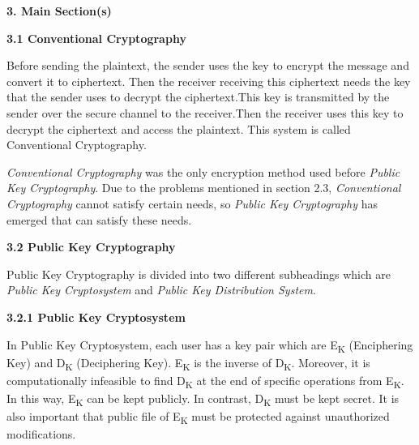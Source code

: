 \documentclass{article}
\begin{document}
\begin{flushleft}
\vspace{5mm}

\textbf{3. Main Section(s)} \newline 

\textbf{3.1 Conventional Cryptography} \newline

\hspace{0.5cm} Before sending the plaintext, the sender uses the key to encrypt the message and convert it to ciphertext. Then the receiver receiving this ciphertext needs the key that the sender uses to decrypt the ciphertext.This key is transmitted by the sender over the secure channel to the receiver.Then the receiver uses this key to decrypt the ciphertext and access the plaintext. This system is called Conventional Cryptography. \newline

\hspace{0.5cm} \textit{Conventional Cryptography} was the only encryption method used before \textit{Public Key Cryptography}. Due to the problems mentioned in section 2.3, \textit{Conventional Cryptography} cannot satisfy certain needs, so \textit{Public Key Cryptography} has emerged that can satisfy these needs.\newline

\vspace{1.2cm}

\textbf{3.2 Public Key Cryptography} \newline

\hspace{0.5cm} Public Key Cryptography is divided into two different subheadings which are \textit{Public Key Cryptosystem} and \textit{Public Key Distribution System}. \newline

\hspace{0.5cm}\textbf{3.2.1 Public Key Cryptosystem} \newline

\hspace{1cm} In Public Key Cryptosystem, each user has a key pair which are E\textsubscript{K} (Enciphering Key) and D\textsubscript{K} (Deciphering Key). E\textsubscript{K} is the inverse of D\textsubscript{K}. Moreover, it is computationally infeasible to find D\textsubscript{K} at the end of specific operations from E\textsubscript{K}. In this way, E\textsubscript{K} can be kept publicly. In contrast, D\textsubscript{K} must be kept secret. It is also important that public file of E\textsubscript{K} must be protected against unauthorized modifications. \newline


\end{flushleft}
\end{document}
